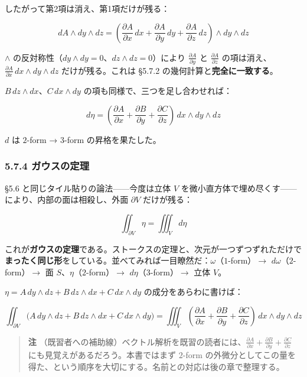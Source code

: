 \documentclass[a4paper,12pt,openany]{book}
\begin{document}
したがって第2項は消え、第1項だけが残る：

\[dA \wedge dy \wedge dz = (\frac{\partial A}{\partial x}\,dx + \frac{\partial A}{\partial y}\,dy + \frac{\partial A}{\partial z}\,dz) \wedge dy \wedge dz\]

\(\wedge\)
の反対称性（\(dy \wedge dy = 0\)、\(dz \wedge dz = 0\)）により
\(\frac{\partial A}{\partial y}\) と \(\frac{\partial A}{\partial z}\)
の項は消え、\(\frac{\partial A}{\partial x}\,dx \wedge dy \wedge dz\)
だけが残る。これは §5.7.2 の幾何計算と\textbf{完全に一致する}。

\(B\,dz \wedge dx\)、\(C\,dx \wedge dy\)
の項も同様で、三つを足し合わせれば：

\[d\eta = (\frac{\partial A}{\partial x} + \frac{\partial B}{\partial y} + \frac{\partial C}{\partial z})\,dx \wedge dy \wedge dz\]

\(d\) は \(2\)-form → \(3\)-form の昇格を果たした。

\hypertarget{ux30acux30a6ux30b9ux306eux5b9aux7406}{%
\subsubsection{5.7.4
ガウスの定理}\label{ux30acux30a6ux30b9ux306eux5b9aux7406}}

§5.6 と同じタイル貼りの論法——今度は立体 \(V\)
を微小直方体で埋め尽くす——により、内部の面は相殺し、外面
\(\partial V\) だけが残る：

\[\iint_{\partial V} \eta = \iiint_V d\eta\]

これが\textbf{ガウスの定理}である。ストークスの定理と、次元が一つずつずれただけで\textbf{まったく同じ形}をしている。並べてみれば一目瞭然だ：\(\omega\)（\(1\)-form）\(\to\)
\(d\omega\)（\(2\)-form）\(\to\) 面 \(S\)、\(\eta\)（\(2\)-form）\(\to\)
\(d\eta\)（\(3\)-form）\(\to\) 立体 \(V\)。

\(\eta = A\,dy \wedge dz + B\,dz \wedge dx + C\,dx \wedge dy\)
の成分をあらわに書けば：

\[\iint_{\partial V} \bigl(A\,dy \wedge dz + B\,dz \wedge dx + C\,dx \wedge dy\bigr) = \iiint_V (\frac{\partial A}{\partial x} + \frac{\partial B}{\partial y} + \frac{\partial C}{\partial z})\,dx \wedge dy \wedge dz\]

\begin{quote}
\textbf{注}
（既習者への補助線）ベクトル解析を既習の読者には、\(\frac{\partial A}{\partial x}+\frac{\partial B}{\partial y}+\frac{\partial C}{\partial z}\)
にも見覚えがあるだろう。本書ではまず \(2\)-form
の外微分としてこの量を得た、という順序を大切にする。名前との対応は後の章で整理する。
\end{quote}
\end{document}
